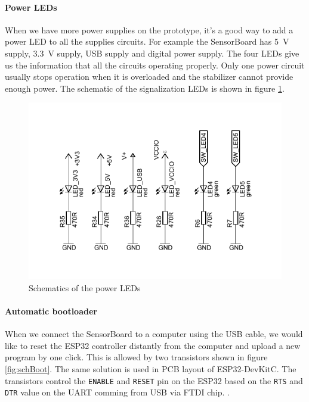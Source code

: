 \paragraph{Power LEDs}

When we have more power supplies on the prototype, it's a good way to add a power \ac{LED} to all the supplies circuits. For example the SensorBoard has \SI{5}{V} supply, \SI{3.3}{V} supply, USB supply and digital power supply. The four \ac{LED}s give us the information that all the circuits operating properly. Only one power circuit usually stops operation when it is overloaded and the stabilizer cannot provide enough power. The schematic of the signalization \ac{LED}s is shown in figure \ref{fig:schLeds}.

\begin{figure}
	\centering
	\label{fig:schLeds}
	\caption{Schematics of the power LEDs}
	\includegraphics[scale=1.3]{img/SchLeds.pdf}
\end{figure}

\paragraph{Automatic bootloader}

When we connect the SensorBoard to a computer using the \ac{USB} cable, we would like to reset the ESP32 controller distantly from the computer and upload a new program by one click. This is allowed by two transistors shown in figure \ref{fig:schBoot}. The same solution is used in \ac{PCB} layout of ESP32-DevKitC. \cite{espressif:ESP32DevKitC} The transistors control the \texttt{ENABLE} and \texttt{RESET} pin on the ESP32 based on the \texttt{RTS} and \texttt{DTR} value on the \ac{UART} comming from \ac{USB} via FTDI chip. \cite{ftdichip:FT232R}.

